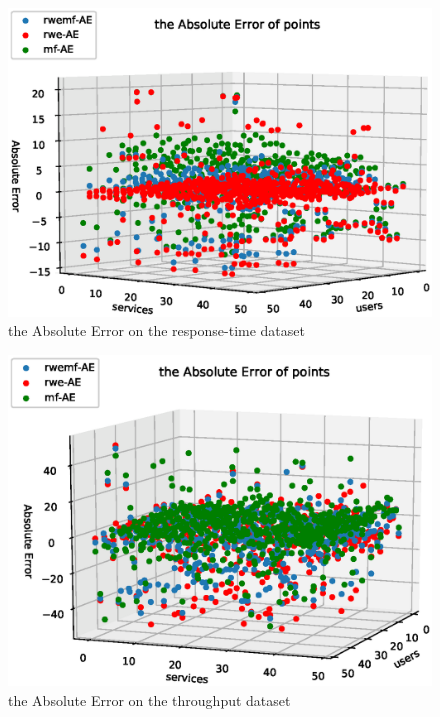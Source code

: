 \documentclass[conference]{IEEEtran}
\begin{document}
\begin{figure}[H] 
\centering  
\includegraphics[width=0.45\paperwidth]{ae_rt.eps}  
\caption{the Absolute Error on the response-time dataset }  
\label{fig_ae_rt}  
\end{figure} 

\begin{figure}[H] 
\centering  
\includegraphics[width=0.45\paperwidth]{ae_tp.eps}  
\caption{the Absolute Error on the throughput dataset }  
\label{fig_ae_tp}  
\end{figure} 

\end{document}
